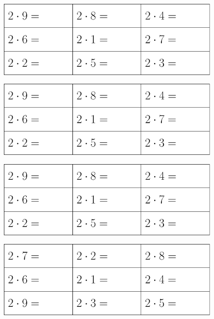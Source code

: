 

\renewcommand{\vs}{\vspace{40pt}}

	 \thispagestyle{empty}
\begin{figure}
	\includegraphics[]{g2}
\end{figure}
\vs
\begin{figure}
	\includegraphics[]{g2}
\end{figure}		
\vs
\begin{figure}
\includegraphics[]{g2}
\end{figure}
\vs
\begin{figure}
	\includegraphics[]{g2a}
\end{figure}	
